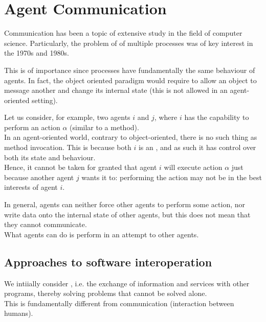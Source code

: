 

\chapter{Agent Communication}
\label{ch:AgentCommunication}

\minitoc

Communication has been a topic of extensive study in the field of computer science. Particularly, the problem of  of multiple processes was of key interest in the 1970s and 1980s.

This is of importance since processes have fundamentally the same behaviour of agents. In fact, the object oriented paradigm would require  to allow an object to message another and change its internal state (this is not allowed in an agent-oriented setting).

Let us consider, for example, two agents $i$ and $j$, where $i$ has the capability to perform an action $\alpha$ (similar to a method).\\
In an agent-oriented world, contrary to object-oriented, there is no such thing as method invocation. This is because both $i$ is an , and as such it has control over both its state and behaviour.\\
Hence, it cannot be taken for granted that agent $i$ will execute action $\alpha$ just because another agent $j$ wants it to: performing the action may not be in the best interests of agent $i$.

In general, agents can neither force other agents to perform some action, nor write data onto the internal state of other agents, but this does not mean that they cannot communicate.\\
What agents can do is perform  in an attempt to  other agents.

\section{Approaches to software interoperation}
We intiially consider , i.e. the exchange of information and services with other programs, thereby solving problems that cannot be solved alone.\\
This is fundamentally different from communication (interaction between humans).

